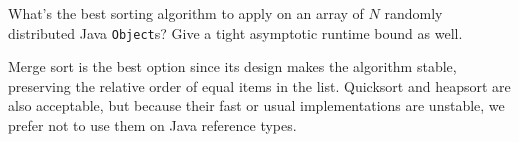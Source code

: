 \question What's the best sorting algorithm to apply on an array of $N$
randomly distributed Java \lstinline$Object$s? Give a tight asymptotic runtime
bound as well.

\begin{solution}[1in]
Merge sort is the best option since its design makes the algorithm stable,
preserving the relative order of equal items in the list. Quicksort and
heapsort are also acceptable, but because their fast or usual implementations
are unstable, we prefer not to use them on Java reference types.
\end{solution}
